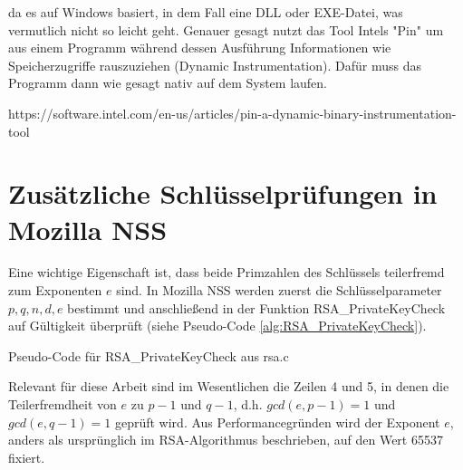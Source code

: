  da es auf Windows basiert, in dem Fall eine DLL
oder EXE-Datei, was vermutlich nicht so leicht geht. Genauer gesagt
nutzt das Tool Intels "Pin" um aus einem Programm während dessen
Ausführung Informationen wie Speicherzugriffe rauszuziehen (Dynamic
Instrumentation). Dafür muss das Programm dann wie gesagt nativ auf dem
System laufen.

https://software.intel.com/en-us/articles/pin-a-dynamic-binary-instrumentation-tool


\section{Zusätzliche Schlüsselprüfungen in Mozilla NSS}
\label{RSAGenGCDAttack}

Eine wichtige Eigenschaft ist, dass beide Primzahlen des Schlüssels teilerfremd zum Exponenten $e$ sind.
In Mozilla NSS werden zuerst die Schlüsselparameter $p,q,n,d,e$ bestimmt und anschließend in der Funktion RSA_PrivateKeyCheck auf Gültigkeit überprüft (siehe Pseudo-Code \ref{alg:RSA_PrivateKeyCheck}).

\begin{algorithm}[h]
\DontPrintSemicolon
\caption{Pseudo-Code für RSA_PrivateKeyCheck aus rsa.c}
\label{alg:RSA_PrivateKeyCheck}

\end{algorithm}


%

Relevant für diese Arbeit sind im Wesentlichen die Zeilen 4 und 5, in denen die Teilerfremdheit von $e$ zu $p-1$ und $q-1$, d.h. $gcd(e,p-1) = 1$ und $gcd(e,q-1) = 1$ geprüft wird.
Aus Performancegründen wird der Exponent $e$, anders als ursprünglich im RSA-Algorithmus beschrieben, auf den Wert 65537 fixiert.

